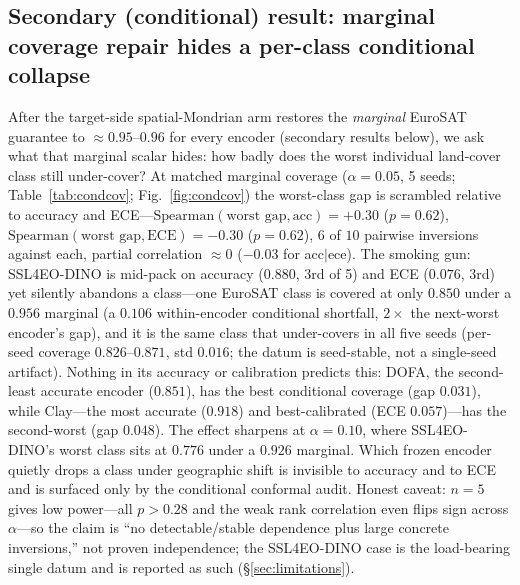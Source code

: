 \documentclass[journal]{IEEEtran}
\renewcommand{\_}{\textunderscore\allowbreak}
\begin{document}
\subsection{Secondary (conditional) result: marginal coverage repair hides a per-class conditional collapse}
After the target-side spatial-Mondrian arm restores the \emph{marginal} EuroSAT guarantee to
$\approx0.95$--$0.96$ for every encoder (secondary results below), we ask what that marginal scalar hides:
how badly does the worst individual land-cover class still under-cover? At matched marginal coverage
($\alpha{=}0.05$, 5 seeds; Table~\ref{tab:condcov}; Fig.~\ref{fig:condcov}) the worst-class gap is scrambled relative to
accuracy and ECE---$\mathrm{Spearman}(\text{worst gap},\text{acc})=+0.30$ ($p{=}0.62$),
$\mathrm{Spearman}(\text{worst gap},\text{ECE})=-0.30$ ($p{=}0.62$), $6$ of $10$ pairwise inversions
against each, partial correlation $\approx0$ ($-0.03$ for acc$\mid$ece). The smoking gun: SSL4EO-DINO is
mid-pack on accuracy ($0.880$, 3rd of 5) and ECE ($0.076$, 3rd) yet silently abandons a class---one
EuroSAT class is covered at only $0.850$ under a $0.956$ marginal (a $0.106$ within-encoder conditional
shortfall, $2\times$ the next-worst encoder's gap), and it is the same class that under-covers in all
five seeds (per-seed coverage $0.826$--$0.871$, std $0.016$; the datum is seed-stable, not a single-seed
artifact). Nothing in its accuracy or calibration predicts this:
DOFA, the second-least accurate encoder ($0.851$), has the best conditional coverage (gap
$0.031$), while Clay---the most accurate ($0.918$) and best-calibrated (ECE $0.057$)---has the
second-worst (gap $0.048$). The effect sharpens at $\alpha{=}0.10$, where SSL4EO-DINO's worst class
sits at $0.776$ under a $0.926$ marginal. Which frozen encoder quietly drops a class under geographic shift
is invisible to accuracy and to ECE and is surfaced only by the conditional conformal audit. Honest
caveat: $n{=}5$ gives low power---all $p>0.28$ and the weak rank correlation even flips sign across
$\alpha$---so the claim is ``no detectable/stable dependence plus large concrete inversions,'' not proven
independence; the SSL4EO-DINO case is the load-bearing single datum and is reported as such
(\S\ref{sec:limitations}).
\end{document}
